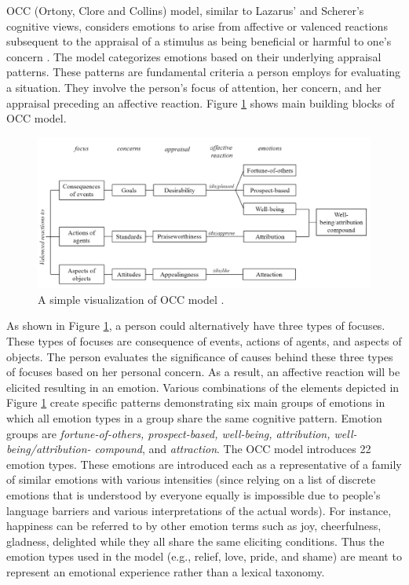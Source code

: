 \documentclass[12pt]{report}
\begin{document}
OCC (Ortony, Clore and Collins) model, similar to Lazarus'
\cite{lazarus:cognitive-theory-emotion} and Scherer's
\cite{scherer:nature-function-emotion} cognitive views, considers emotions to
arise from affective or valenced reactions subsequent to the appraisal of a
stimulus as being beneficial or harmful to one’s concern \cite{occ:structure}.
The model categorizes emotions based on their underlying appraisal patterns.
These patterns are fundamental criteria a person employs for evaluating a
situation. They involve the person's focus of attention, her concern, and
her appraisal preceding an affective reaction. Figure \ref{fig:occ-model} shows
main building blocks of OCC model.

\begin{figure}[tbh]
  \center
  \includegraphics[width=\textwidth]{figure/occ.png}
  \caption{A simple visualization of OCC model \cite{occ:structure}.}
  \label{fig:occ-model}
\end{figure}

As shown in Figure \ref{fig:occ-model}, a person could alternatively have three
types of focuses. These types of focuses are consequence of events, actions of
agents, and aspects of objects. The person evaluates the significance of causes
behind these three types of focuses based on her personal concern. As a
result, an affective reaction will be elicited resulting in an emotion. Various
combinations of the elements depicted in Figure \ref{fig:occ-model} create
specific patterns demonstrating six main groups of emotions in which all emotion
types in a group share the same cognitive pattern. Emotion groups are
\textit{fortune-of-others, prospect-based, well-being, attribution,
well-being/attribution- compound}, and \textit{attraction}. The OCC model
introduces 22 emotion types. These emotions are introduced each as a
representative of a family of similar emotions with various intensities
(since relying on a list of discrete emotions that is understood by everyone
equally is impossible due to people's language barriers and various
interpretations of the actual words). For instance, happiness can be referred
to by other emotion terms such as joy, cheerfulness, gladness, delighted while
they all share the same eliciting conditions. Thus the emotion types used in the
model (e.g., relief, love, pride, and shame) are meant to represent an emotional
experience rather than a lexical taxonomy.
\end{document}
